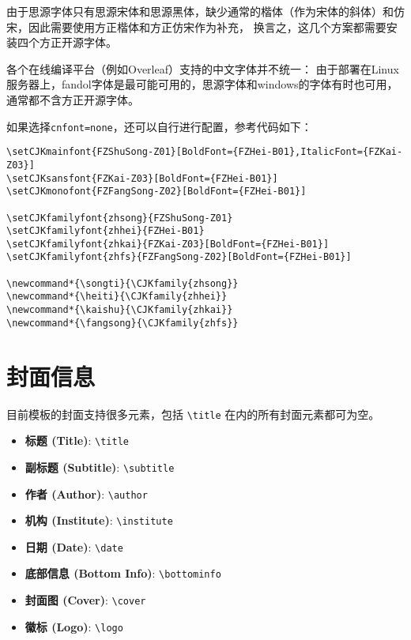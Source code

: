 \documentclass[lang=cn,10pt,cnfont=NotoCJK]{../simplebook}
\begin{document}
\begin{remark}
    由于思源字体只有思源宋体和思源黑体，缺少通常的楷体（作为宋体的斜体）和仿宋，因此需要使用方正楷体和方正仿宋作为补充，
    换言之，这几个方案都需要安装四个方正开源字体。
\end{remark}

\begin{remark}
    各个在线编译平台（例如Overleaf）支持的中文字体并不统一：
    由于部署在Linux服务器上，fandol字体是最可能可用的，思源字体和windows的字体有时也可用，通常都不含方正开源字体。
\end{remark}

如果选择\lstinline{cnfont=none}，还可以自行进行配置，参考代码如下：
\begin{lstlisting}[frame=single]
\setCJKmainfont{FZShuSong-Z01}[BoldFont={FZHei-B01},ItalicFont={FZKai-Z03}]
\setCJKsansfont{FZKai-Z03}[BoldFont={FZHei-B01}]
\setCJKmonofont{FZFangSong-Z02}[BoldFont={FZHei-B01}]

\setCJKfamilyfont{zhsong}{FZShuSong-Z01}
\setCJKfamilyfont{zhhei}{FZHei-B01}
\setCJKfamilyfont{zhkai}{FZKai-Z03}[BoldFont={FZHei-B01}]
\setCJKfamilyfont{zhfs}{FZFangSong-Z02}[BoldFont={FZHei-B01}]

\newcommand*{\songti}{\CJKfamily{zhsong}}
\newcommand*{\heiti}{\CJKfamily{zhhei}}
\newcommand*{\kaishu}{\CJKfamily{zhkai}}
\newcommand*{\fangsong}{\CJKfamily{zhfs}}
\end{lstlisting}

\section{封面信息}

目前模板的封面支持很多元素，包括 \lstinline{\title} 在内的所有封面元素都可为空。

\begin{itemize}
    \item \textbf{标题 (Title)}: \lstinline|\title|
    \item \textbf{副标题 (Subtitle)}: \lstinline|\subtitle|
    \item \textbf{作者 (Author)}: \lstinline|\author|
    \item \textbf{机构 (Institute)}: \lstinline|\institute|
    \item \textbf{日期 (Date)}: \lstinline|\date|
    \item \textbf{底部信息 (Bottom Info)}: \lstinline|\bottominfo|
    \item \textbf{封面图 (Cover)}: \lstinline|\cover|
    \item \textbf{徽标 (Logo)}: \lstinline|\logo|
\end{itemize}
\end{document}
